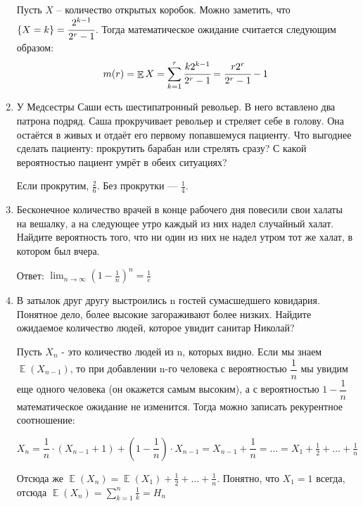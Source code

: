 \documentclass[12pt]{article}
\let\P\relax
\DeclareMathOperator{\P}{\mathbb{P}}
\DeclareMathOperator{\E}{\mathbb{E}}
\newenvironment{solution}{}{}
\begin{document}
\begin{enumerate}
\begin{solution}
    Пусть $X$ -- количество открытых коробок. Можно заметить, что $\P\{X=k\} = \cfrac{2^{k-1}}{2^r-1}$. Тогда математическое ожидание считается следующим образом:
    $$
    m(r) = \E X = \sum_{k=1}^{r} \cfrac{k2^{k-1}}{2^r-1} = \cfrac{r2^r}{2^r-1} - 1 
    $$
\end{solution}
    
    \item У Медсестры Саши есть шестипатронный револьер. В него вставлено два патрона подряд. Саша прокручивает револьер и стреляет себе в голову. Она остаётся в живых и отдаёт его первому попавшемуся пациенту. Что выгоднее сделать пациенту: прокрутить барабан или стрелять сразу? С какой вероятностью пациент умрёт в обеих ситуациях?
    
\begin{solution}
    Если прокрутим, $\frac{2}{6}$. Без прокрутки — $\frac{1}{4}$.
\end{solution}
    
    \item Бесконечное количество врачей в конце рабочего дня повесили свои халаты на вешалку, а на следующее утро каждый из них надел случайный халат. Найдите вероятность того, что ни один из них не надел утром тот же халат, в котором был вчера.
    
\begin{solution}
    Ответ: $\lim_{n \to \infty}(1-\frac{1}{n})^{n}=\frac{1}{e}$
\end{solution}

    \item В затылок друг другу выстроились n гостей сумасшедшего ковидария. Понятное дело, более высокие загораживают более низких. Найдите ожидаемое количество людей, которое увидит санитар Николай?
    
\begin{solution}
    Пусть $X_n$ - это количество людей из n, которых видно. Если мы знаем $\E({X_{n - 1}})$, то при добавлении n-го человека с вероятностью $\dfrac{1}{n}$ мы увидим еще одного человека (он окажется самым высоким), а с вероятностью $1 - \dfrac{1}{n}$ математическое ожидание не изменится. Тогда можно записать рекурентное соотношение:
    
    $X_n = \dfrac{1}{n} \cdot (X_{n - 1} + 1) + (1 - \dfrac{1}{n}) \cdot X_{n - 1} = X_{n-1} + \dfrac{1}{n} = \dots = X_1 + \frac{1}{2} + \dots + \frac{1}{n}$
    
    Отсюда же $\E(X_n) = \E(X_1) + \frac{1}{2} + \dots + \frac{1}{n}$. Понятно, что $X_1 = 1$ всегда, отсюда $\E(X_n) = \sum_{k = 1}^n \frac{1}{k} = H_n$
\end{solution}


\end{enumerate}
\end{document}
